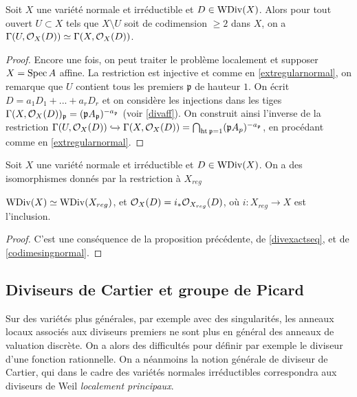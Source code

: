\begin{prop}\label{isomorphismcodim2}
Soit $X$ une variété normale et irréductible et $D\in\operatorname{WDiv}(X)$. Alors pour tout ouvert $U\subset X$ tels que $X\setminus U$ soit de codimension $\geq 2$ dans $X$, on a $\Gamma(U,\mathcal{O}_X(D))\simeq \Gamma(X,\mathcal{O}_X(D))$.
\end{prop}
\begin{proof}
Encore une fois, on peut traiter le problème localement et supposer $X=\operatorname{Spec} A$ affine. La restriction est injective et comme en \ref{extregularnormal}, on remarque que $U$ contient tous les premiers $\mathfrak{p}$ de hauteur $1$. On écrit $D=a_1D_1+...+a_rD_r$ et on considère les injections dans les tiges $\Gamma(X,\mathcal{O}_X(D))_\mathfrak{p}=(\mathfrak{p}A_\mathfrak{p})^{-a_\mathfrak{p}}$ (voir \ref{divaff}). On construit ainsi l'inverse de la restriction $\Gamma(U, \mathcal{O}_X(D))\xhookrightarrow{}\Gamma(X,\mathcal{O}_X(D))=\bigcap_{\operatorname{ht}\mathfrak{p}=1}(\mathfrak{p}A_p)^{-a_\mathfrak{p}}$, en procédant comme en \ref{extregularnormal}.
\end{proof}

\begin{cor}\label{isomorphismcodim2CorXreg}
Soit $X$ une variété normale et irréductible et $D\in\operatorname{WDiv}(X)$. On a des isomorphismes donnés par la restriction à $X_{reg}$
\begin{center}
$\operatorname{WDiv}(X)\simeq \operatorname{WDiv}(X_{reg})$, et  $\mathcal{O}_X(D)=i_*\mathcal{O}_{X_{reg}}(D)$, où $i:X_{reg}\rightarrow X$ est l'inclusion.
\end{center}
\end{cor}
\begin{proof}
C'est une conséquence de la proposition précédente, de \ref{divexactseq}, et de \ref{codimesingnormal}.
\end{proof}

\subsection{Diviseurs de Cartier et groupe de Picard}
\label{SectionDivCartierPicardGroup}
Sur des variétés plus générales, par exemple avec des singularités, les anneaux locaux associés aux diviseurs premiers ne sont plus en général des anneaux de valuation discrète. On a alors des difficultés pour définir par exemple le diviseur d'une fonction rationnelle. On a néanmoins la notion générale de diviseur de Cartier, qui dans le cadre des variétés normales irréductibles correspondra aux diviseurs de Weil \textit{localement principaux}.


